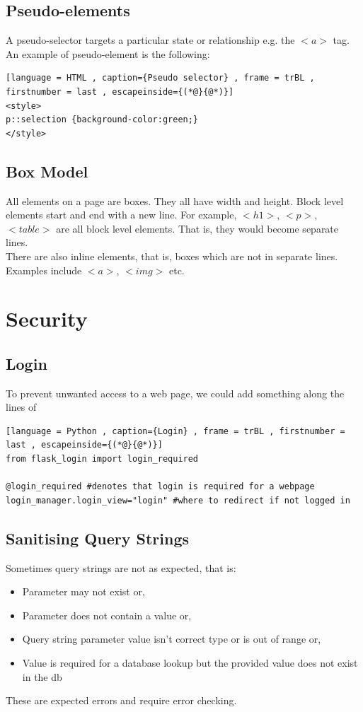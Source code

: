 \documentclass[a4paper]{article}
\theoremstyle{plain}
\theoremstyle{definition}
\theoremstyle{remark}
\begin{document}
\begin{flushleft}
\subsection{Pseudo-elements}
A pseudo-selector targets a particular state or relationship e.g. the $<a>$ tag. An example of pseudo-element is the following:
\begin{lstlisting}[language = HTML , caption={Pseudo selector} , frame = trBL , firstnumber = last , escapeinside={(*@}{@*)}]
<style>
p::selection {background-color:green;}
</style>
\end{lstlisting}
\subsection{Box Model}
All elements on a page are boxes. They all have width and height. 
Block level elements start and end with a new line. For example, $<h1>$, $<p>$, $<table>$ are all block level elements. That is, they would become separate lines. \\
There are also inline elements, that is, boxes which are not in separate lines. Examples include $<a>$, $<img>$ etc. 
\section{Security}
\subsection{Login}
To prevent unwanted access to a web page, we could add something along the lines of
\begin{lstlisting}[language = Python , caption={Login} , frame = trBL , firstnumber = last , escapeinside={(*@}{@*)}]
from flask_login import login_required 

@login_required #denotes that login is required for a webpage
login_manager.login_view="login" #where to redirect if not logged in
\end{lstlisting}
\subsection{Sanitising Query Strings}
Sometimes query strings are not as expected, that is:
\begin{itemize}
	\item Parameter may not exist or,
	\item Parameter does not contain a value or,
	\item Query string parameter value isn't correct type or is out of range or,
	\item Value is required for a database lookup but the provided value does not exist in the db
\end{itemize}
These are expected errors and require error checking.

\end{flushleft}
\end{document}
